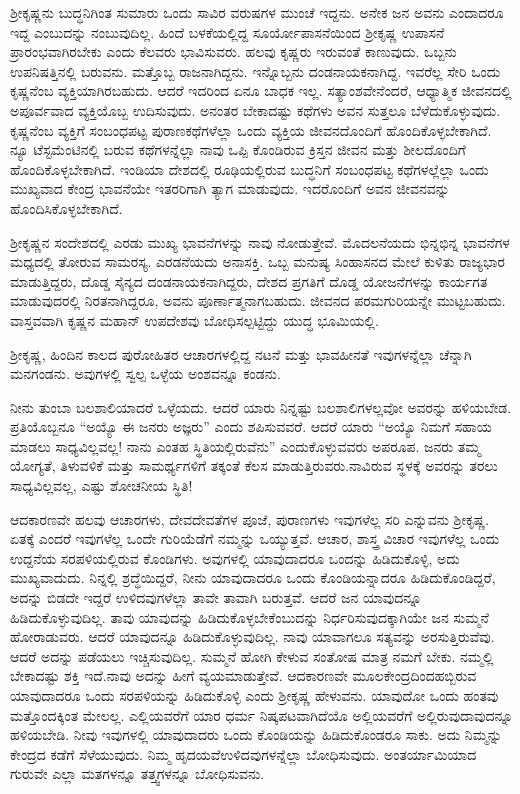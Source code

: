 ಶ‍್ರೀಕೃಷ್ಣನು ಬುದ್ಧನಿಗಿಂತ ಸುಮಾರು ಒಂದು ಸಾವಿರ ವರುಷಗಳ ಮುಂಚೆ ಇದ್ದನು. ಅನೇಕ ಜನ ಅವನು ಎಂದಾದರೂ ಇದ್ದ ಎಂಬುದನ್ನು ನಂಬುವುದಿಲ್ಲ. ಹಿಂದೆ ಬಳಕೆ\-ಯಲ್ಲಿದ್ದ ಸೂರ್ಯೋಪಾಸನೆಯಿಂದ ಶ‍್ರೀಕೃಷ್ಣ ಉಪಾಸನೆ ಪ್ರಾರಂಭವಾಗಿರಬೇಕು ಎಂದು ಕೆಲವರು ಭಾವಿಸುವರು. ಹಲವು ಕೃಷ್ಣರು ಇರುವಂತೆ ಕಾಣುವುದು. ಒಬ್ಬನು ಉಪನಿಷತ್ತಿನಲ್ಲಿ ಬರುವನು. ಮತ್ತೊಬ್ಬ ರಾಜನಾಗಿದ್ದನು. ಇನ್ನೊಬ್ಬನು ದಂಡನಾಯಕ\-ನಾಗಿದ್ದ. ಇವರೆಲ್ಲ ಸೇರಿ ಒಂದು ಕೃಷ್ಣನೆಂಬ ವ್ಯಕ್ತಿಯಾಗಿರಬಹುದು. ಆದರೆ ಇದರಿಂದ ಏನೂ ಬಾಧಕ ಇಲ್ಲ. ಸತ್ಯಾಂಶವೇನೆಂದರೆ, ಆಧ್ಯಾತ್ಮಿಕ ಜೀವನದಲ್ಲಿ ಅಪೂರ್ವವಾದ ವ್ಯಕ್ತಿಯೊಬ್ಬ ಉದಿಸುವುದು. ಅನಂತರ ಬೇಕಾದಷ್ಟು ಕಥೆಗಳು ಅವನ ಸುತ್ತಲೂ ಬೆಳೆದುಕೊಳ್ಳುವುದು. ಕೃಷ್ಣನೆಂಬ ವ್ಯಕ್ತಿಗೆ ಸಂಬಂಧಪಟ್ಟ ಪುರಾಣಕಥೆಗಳೆಲ್ಲಾ ಒಂದು ವ್ಯಕ್ತಿಯ ಜೀವನದೊಂದಿಗೆ ಹೊಂದಿಕೊಳ್ಳಬೇಕಾಗಿದೆ. ನ್ಯೂ ಟೆಸ್ಟಮೆಂಟಿನಲ್ಲಿ ಬರುವ ಕಥೆಗಳನ್ನೆಲ್ಲಾ ನಾವು ಒಪ್ಪಿ \-ಕೊಂಡಿರುವ ಕ್ರಿಸ್ತನ ಜೀವನ ಮತ್ತು ಶೀಲದೊಂದಿಗೆ ಹೊಂದಿಕೊಳ್ಳಬೇಕಾಗಿದೆ. ಇಂಡಿಯಾ ದೇಶದಲ್ಲಿ ರೂಢಿಯಲ್ಲಿರುವ ಬುದ್ಧನಿಗೆ ಸಂಬಂಧಪಟ್ಟ ಕಥೆಗಳಲ್ಲೆಲ್ಲಾ ಒಂದು ಮುಖ್ಯವಾದ ಕೇಂದ್ರ ಭಾವನೆಯೇ ಇತರರಿಗಾಗಿ ತ್ಯಾಗ ಮಾಡುವುದು. ಇದರೊಂದಿಗೆ ಅವನ ಜೀವನವನ್ನು ಹೊಂದಿಸಿಕೊಳ್ಳಬೇಕಾಗಿದೆ.

ಶ‍್ರೀಕೃಷ್ಣನ ಸಂದೇಶದಲ್ಲಿ ಎರಡು ಮುಖ್ಯ ಭಾವನೆಗಳನ್ನು ನಾವು ನೋಡುತ್ತೇವೆ. ಮೊದಲನೆಯದು ಭಿನ್ನಭಿನ್ನ ಭಾವನೆಗಳ ಮಧ್ಯದಲ್ಲಿ ತೋರುವ ಸಾಮರಸ್ಯ. ಎರಡನೆಯದು ಅನಾಸಕ್ತಿ. ಒಬ್ಬ ಮನುಷ್ಯ ಸಿಂಹಾಸನದ ಮೇಲೆ ಕುಳಿತು ರಾಜ್ಯಭಾರ ಮಾಡುತ್ತಿದ್ದರು, ದೊಡ್ಡ ಸೈನ್ಯದ ದಂಡನಾಯಕನಾಗಿದ್ದರು, ದೇಶದ ಪ್ರಗತಿಗೆ ದೊಡ್ಡ ಯೋಜನೆಗಳನ್ನು ಕಾರ್ಯಗತ ಮಾಡುವುದರಲ್ಲಿ ನಿರತನಾಗಿದ್ದರೂ, ಅವನು ಪೂರ್ಣಾತ್ಮನಾಗಬಹುದು. ಜೀವನದ ಪರಮಗುರಿಯನ್ನೇ ಮುಟ್ಟಬಹುದು. ವಾಸ್ತವವಾಗಿ ಕೃಷ್ಣನ ಮಹಾನ್​ ಉಪದೇಶವು ಬೋಧಿಸಲ್ಪಟ್ಟಿದ್ದು ಯುದ್ಧ ಭೂಮಿಯಲ್ಲಿ.

\newpage

ಶ‍್ರೀಕೃಷ್ಣ, ಹಿಂದಿನ ಕಾಲದ ಪುರೋಹಿತರ ಆಚಾರಗಳಲ್ಲಿದ್ದ ನಟನೆ ಮತ್ತು ಭಾವಹೀನತೆ ಇವುಗಳನ್ನೆಲ್ಲಾ ಚೆನ್ನಾಗಿ ಮನಗಂಡನು. ಅವುಗಳಲ್ಲಿ ಸ್ವಲ್ಪ ಒಳ್ಳೆಯ ಅಂಶವನ್ನೂ ಕಂಡನು.

ನೀನು ತುಂಬಾ ಬಲಶಾಲಿಯಾದರೆ ಒಳ್ಳೆಯದು. ಆದರೆ ಯಾರು ನಿನ್ನಷ್ಟು ಬಲಶಾಲಿಗಳಲ್ಲವೋ ಅವರನ್ನು ಹಳಿಯಬೇಡ. ಪ್ರತಿಯೊಬ್ಬನೂ “ಅಯ್ಯೊ ಈ ಜನರು ಅಜ್ಞರು” ಎಂದು ಶಪಿಸುವವರೆ. ಆದರೆ ಯಾರು “ಅಯ್ಯೊ ನಿಮಗೆ ಸಹಾಯ ಮಾಡಲು ಸಾಧ್ಯವಿಲ್ಲವಲ್ಲ! ನಾನು ಎಂತಹ ಸ್ಥಿತಿಯಲ್ಲಿರುವೆನು” ಎಂದುಕೊಳ್ಳುವವರು ಅಪರೂಪ. ಜನರು ತಮ್ಮ ಯೋಗ್ಯತೆ, ತಿಳುವಳಿಕೆ ಮತ್ತು ಸಾಮರ್ಥ್ಯಗಳಿಗೆ ತಕ್ಕಂತೆ ಕೆಲಸ ಮಾಡುತ್ತಿರುವರು.\break ನಾವಿರುವ ಸ್ಥಳಕ್ಕೆ ಅವರನ್ನು ತರಲು ಸಾಧ್ಯವಿಲ್ಲವಲ್ಲ, ಎಷ್ಟು ಶೋಚನೀಯ ಸ್ಥಿತಿ!

ಆದಕಾರಣವೇ ಹಲವು ಆಚಾರಗಳು, ದೇವದೇವತೆಗಳ ಪೂಜೆ, ಪುರಾಣಗಳು ಇವುಗಳೆಲ್ಲ ಸರಿ ಎನ್ನುವನು ಶ‍್ರೀಕೃಷ್ಣ. ಏತಕ್ಕೆ ಎಂದರೆ ಇವುಗಳೆಲ್ಲ ಒಂದೇ ಗುರಿಯೆಡೆಗೆ ನಮ್ಮನ್ನು ಒಯ್ಯುತ್ತವೆ. ಆಚಾರ, ಶಾಸ್ತ್ರ ವಿಚಾರ ಇವುಗಳೆಲ್ಲ ಒಂದು ಉದ್ದನೆಯ ಸರಪಳಿ\-ಯಲ್ಲಿರುವ ಕೊಂಡಿಗಳು. ಅವುಗಳಲ್ಲಿ ಯಾವುದಾದರೂ ಒಂದನ್ನು ಹಿಡಿದುಕೊಳ್ಳಿ, ಅದು ಮುಖ್ಯವಾದುದು. ನಿನ್ನಲ್ಲಿ ಶ್ರದ್ಧೆಯಿದ್ದರೆ, ನೀನು ಯಾವುದಾದರೂ ಒಂದು ಕೊಂಡಿಯನ್ನಾ\-ದರೂ ಹಿಡಿದುಕೊಂಡಿದ್ದರೆ, ಅದನ್ನು ಬಿಡದೇ ಇದ್ದರೆ ಉಳಿದವುಗಳೆಲ್ಲಾ ತಾವೇ ತಾವಾಗಿ ಬರುತ್ತವೆ. ಆದರೆ ಜನ ಯಾವುದನ್ನೂ ಹಿಡಿದುಕೊಳ್ಳುವುದಿಲ್ಲ. ತಾವು ಯಾವುದನ್ನು ಹಿಡಿದುಕೊಳ್ಳಬೇಕೆಂಬುದನ್ನು ನಿರ್ಧರಿಸುವುದಕ್ಕಾಗಿಯೇ ಜನ ಸುಮ್ಮನೆ ಹೋರಾಡುವರು. ಆದರೆ ಯಾವುದನ್ನೂ ಹಿಡಿದುಕೊಳ್ಳುವುದಿಲ್ಲ. ನಾವು ಯಾವಾಗಲೂ ಸತ್ಯವನ್ನು ಅರಸುತ್ತಿರುವೆವು. ಆದರೆ ಅದನ್ನು ಪಡೆಯಲು ಇಚ್ಚಿಸುವುದಿಲ್ಲ. ಸುಮ್ಮನೆ ಹೋಗಿ ಕೇಳುವ ಸಂತೋಷ ಮಾತ್ರ ನಮಗೆ ಬೇಕು. ನಮ್ಮಲ್ಲಿ ಬೇಕಾದಷ್ಟು ಶಕ್ತಿ ಇದೆ.\break ನಾವು ಅದನ್ನು ಹೀಗೆ ವ್ಯಯಮಾಡುತ್ತೇವೆ. ಆದಕಾರಣವೇ ಮೂಲಕೇಂದ್ರದಿಂದ\break ಹಬ್ಬಿರುವ ಯಾವುದಾದರೂ ಒಂದು ಸರಪಳಿಯನ್ನು ಹಿಡಿದುಕೊಳ್ಳಿ ಎಂದು ಶ‍್ರೀಕೃಷ್ಣ ಹೇಳುವನು. ಯಾವುದೋ ಒಂದು ಹಂತವು ಮತ್ತೊಂದಕ್ಕಿಂತ ಮೇಲಲ್ಲ. ಎಲ್ಲಿಯವರೆಗೆ ಯಾರ ಧರ್ಮ ನಿಷ್ಕಪಟವಾಗಿದೆಯೊ ಅಲ್ಲಿಯವರೆಗೆ ಅಲ್ಲಿರುವುದಾವುದನ್ನೂ ಹಳಿಯಬೇಡಿ. ನೀವು ಇವುಗಳಲ್ಲಿ ಯಾವುದಾದರು ಒಂದು ಕೊಂಡಿಯನ್ನು ಹಿಡಿದು\break ಕೊಂಡರೂ ಸಾಕು. ಅದು ನಿಮ್ಮನ್ನು ಕೇಂದ್ರದ ಕಡೆಗೆ ಸೆಳೆಯುವುದು. ನಿಮ್ಮ ಹೃದಯವೆ\break ಉಳಿದವುಗಳನ್ನೆಲ್ಲಾ ಬೋಧಿಸುವುದು. ಅಂತರ್ಯಾಮಿಯಾದ ಗುರುವೇ ಎಲ್ಲಾ ಮತ\-ಗಳನ್ನೂ ತತ್ತ್ವಗಳನ್ನೂ ಬೋಧಿಸುವನು.

